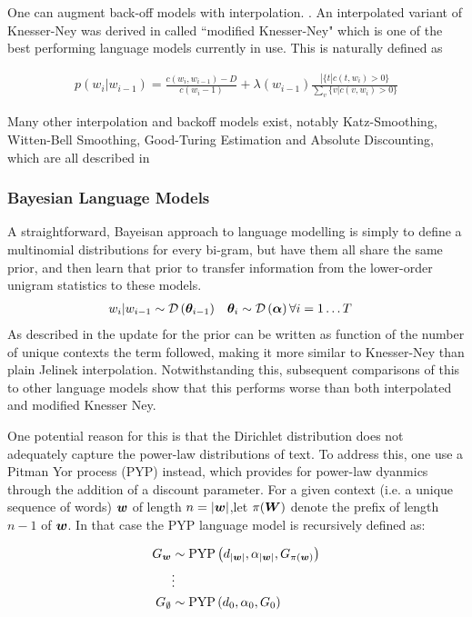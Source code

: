 One can augment back-off models with interpolation. . An interpolated variant of Knesser-Ney was derived in\cite{Goodman2001} called ``modified Knesser-Ney" which is one of the best performing language models currently in use. This is naturally defined as

\begin{align}
p(w_i | w_{i-1}) = \frac{c(w_i, w_{i-1}) - D}{c(w_i-1)} + \lambda(w_{i-1})\frac{ | \{t | c(t, w_i) > 0\} }{\sum_v \{v | c(v, w_i) > 0\}}
\end{align}

Many other interpolation and backoff models exist, notably Katz-Smoothing, Witten-Bell Smoothing, Good-Turing Estimation and Absolute Discounting, which are all described in \cite{Goodman2001}

\subsubsection*{Bayesian Language Models}
A straightforward, Bayeisan approach to language modelling is simply to define a multinomial distributions for every bi-gram, but have them all share the same prior, and then learn that prior to transfer information from the lower-order unigram statistics to these models.
\begin{align}
w_i|w_{i-1} & \sim \mathcal{D} \left( {\bm \theta_{i-1}} \right) & \bm \theta_i & \sim \mathcal{D} \left( {\bm \alpha} \right) \forall i = 1\ldots T
\end{align}
As described in\cite{MacKay1995} the update for the prior can be written as function of the number of unique contexts the term followed, making it more similar to Knesser-Ney than plain Jelinek interpolation. Notwithstanding this, subsequent comparisons of this to other language models show\cite{Teh} that this performs worse than both interpolated and modified Knesser Ney.

One potential reason for this is that the Dirichlet distribution does not adequately capture the power-law distributions of text. To address this, one use a Pitman Yor process (PYP) instead, which provides for power-law dyanmics through the addition of a discount parameter. For a given context (i.e. a unique sequence of words) $\bm w$ of length $n = |\bm w|$,let $\pi(\bm W)$ denote the prefix of length $n-1$ of $\bm w$. In that case the PYP language model is recursively defined as\cite{Teh}:

\begin{align}
G_{\bm w} & \sim \text{PYP}\left(d_{|\bm w|}, \alpha_{|\bm w|}, G_{\pi(\bm w)} \right) \\
& \vdots \\
G_{\emptyset} &\sim \text{PYP}\left(d_0, \alpha_0, G_0\right)
\end{align}

